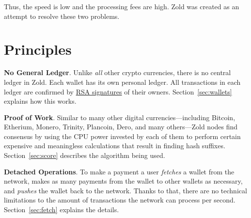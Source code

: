 \documentclass[11pt,oneside]{article}
\begin{document}
Thus, the speed is low and the processing fees are high.
Zold was created as an attempt to resolve these two problems.

\section{Principles}

\textbf{No General Ledger}.
Unlike \emph{all} other crypto currencies, there is no central ledger in Zold.
Each wallet has its own personal ledger.
All transactions in each ledger are confirmed by
\href{https://en.wikipedia.org/wiki/RSA_(cryptosystem)}{RSA signatures} of their owners.
Section~\ref{sec:wallets} explains how this works.

\textbf{Proof of Work}.
Similar to many other digital currencies---including Bitcoin, Etherium, Monero, Trinity, Plancoin, Dero,
and many others---Zold nodes find consensus by using the CPU power invested
by each of them to perform certain expensive and meaningless calculations that result in finding hash suffixes.
Section~\ref{sec:score} describes the algorithm being used.

\textbf{Detached Operations}.
To make a payment a user \emph{fetches} a wallet from the network,
makes as many payments from the wallet to other wallets as necessary,
and \emph{pushes} the wallet back to the network.
Thanks to that, there are no technical limitations to
the amount of transactions the network can process per second.
Section~\ref{sec:fetch} explains the details.
\end{document}
